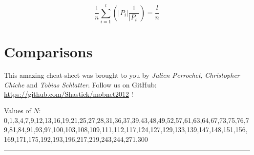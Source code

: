 \documentclass[6pt]{scrartcl}
\begin{document}
\begin{multicols}{4}
\begin{equation*}
\frac1n\sum_{i=1}^l(|P_i|\frac1{|P_i|}) = \frac ln
\end{equation*}

\section{Comparisons}

\begin{center}
This amazing cheat-sheet was brought to you by \emph{Julien Perrochet}, \emph{Christopher Chiche} and \emph{Tobias Schlatter}. Follow us on GitHub: \url{https://github.com/Shastick/mobnet2012} !
\end{center}
\end{multicols}

\begin{center}
\vspace{-10pt}
Values of $N$: 0,1,3,4,7,9,12,13,16,19,21,25,27,28,31,36,37,39,43,48,49,52,57,61,63,64,67,73,75,76,79,81,84,91,93,97,100,103,108,109,111,112,117,124,127,129,133,139,147,148,151,156,169,171,175,192,193,196,217,219,243,244,271,300



\end{center}
\vspace{-5pt}
\hrule
\vspace{-10pt}

\end{document}
